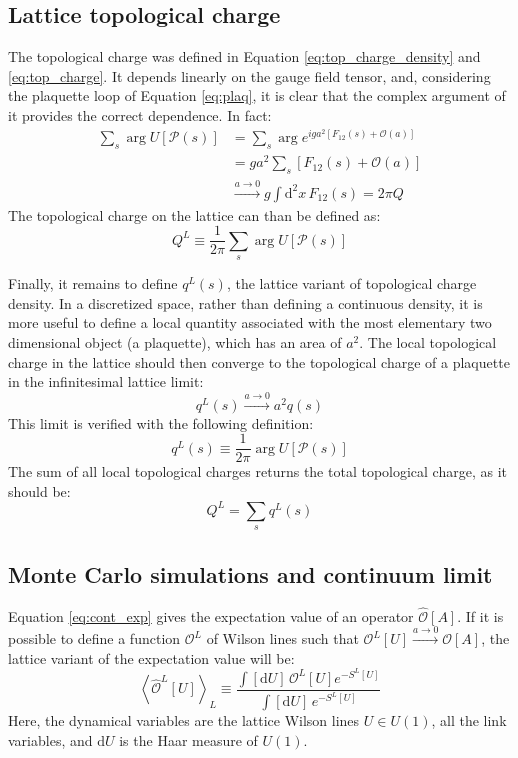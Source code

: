 \subsection*{Lattice topological charge}

The topological charge was defined in Equation \eqref{eq:top_charge_density} and \eqref{eq:top_charge}.
It depends linearly on the gauge field tensor, and,
considering the plaquette loop of Equation \eqref{eq:plaq},
it is clear that the complex argument of it provides the correct dependence.
In fact:
\[
    \begin{aligned}
        \sum_s\arg U[\mathcal P(s)] &= \sum_s\arg e^{iga^2\left[F_{12}(s) + \mathcal O\left(a\right)\right]} \\
                                        &= ga^2\sum_s\left[F_{12}(s) + \mathcal O\left(a\right)\right] \\
                                        &\xrightarrow{a\to0} g\int\mathrm d^2x\,F_{12}(s) = 2\pi Q
    \end{aligned}
\]
The topological charge on the lattice can than be defined as:
\begin{equation}\label{eq:lat_top_charge}
    Q^L \equiv \frac{1}{2\pi}\sum_s\arg U[\mathcal P(s)]
\end{equation}

Finally, it remains to define $q^L(s)$, the lattice variant of topological charge density.
In a discretized space, rather than defining a continuous density,
it is more useful to define a local quantity associated with the most elementary two dimensional object (\ie a plaquette),
which has an area of $a^2$.
The local topological charge in the lattice should then converge to the topological charge of a plaquette in the infinitesimal lattice limit:
\[
    q^L(s) \xrightarrow{a\to0} a^2q(s)
\]
This limit is verified with the following definition:
\begin{equation}\label{eq:lat_loc_top_charge}
    q^L(s) \equiv \frac{1}{2\pi}\arg U[\mathcal P(s)]
\end{equation}
The sum of all local topological charges returns the total topological charge, as it should be:
\[
    Q^L = \sum_sq^L(s)
\]

\subsection*{Monte Carlo simulations and continuum limit}

Equation \eqref{eq:cont_exp} gives the expectation value of an operator $\hat{\mathcal O}[A]$.
If it is possible to define a function $\mathcal O^L$ of Wilson lines such that $\mathcal O^L[U] \xrightarrow{a\to0} \mathcal O[A]$,
the lattice variant of the expectation value will be:
\begin{equation}\label{eq:lat_exp}
    \left<\hat{\mathcal O}^L[U]\right>_L \equiv \frac{\int[\mathrm dU]\, \mathcal O^L[U] e^{-S^L[U]}}{\int[\mathrm dU]\,e^{-S^L[U]}}
\end{equation}
Here, the dynamical variables are the lattice Wilson lines $U \in U(1)$, \ie all the link variables, and $\mathrm dU$ is the Haar measure of $U(1)$.

